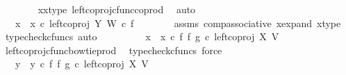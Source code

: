 \begin{isabellebody}
\ \ \ \ \ \ \isamarkupfalse%
\ x{}{\isacharunderscore}{\kern0pt}x{}{\isacharunderscore}{\kern0pt}type\ left{\isacharunderscore}{\kern0pt}coproj{\isacharunderscore}{\kern0pt}cfunc{\isacharunderscore}{\kern0pt}coprod\ \isamarkupfalse%
\ auto\ \isanewline
\ \ \ \ \isamarkupfalse%
\ \isamarkupfalse%
\ {\isachardoublequoteopen}{\isachardot}{\kern0pt}{\isachardot}{\kern0pt}{\isachardot}{\kern0pt}\ {\isacharequal}{\kern0pt}\ {\isacharparenleft}{\kern0pt}x{}\ {\isasymamalg}\ x{}{\isacharparenright}{\kern0pt}\ {\isasymcirc}\isactrlsub c\ left{\isacharunderscore}{\kern0pt}coproj\ Y\ W\ {\isasymcirc}\isactrlsub c\ f{\isachardoublequoteclose}\isanewline
\ \ \ \ \ \ \isamarkupfalse%
\ assms\ comp{\isacharunderscore}{\kern0pt}associative{}\ x{\isacharunderscore}{\kern0pt}expand\ x{\isacharunderscore}{\kern0pt}type\ \isamarkupfalse%
\ {\isacharparenleft}{\kern0pt}typecheck{\isacharunderscore}{\kern0pt}cfuncs{\isacharcomma}{\kern0pt}\ auto{\isacharparenright}{\kern0pt}\isanewline
\ \ \ \ \isamarkupfalse%
\ \isamarkupfalse%
\ {\isachardoublequoteopen}{\isachardot}{\kern0pt}{\isachardot}{\kern0pt}{\isachardot}{\kern0pt}\ {\isacharequal}{\kern0pt}\ {\isacharparenleft}{\kern0pt}x{}\ {\isasymamalg}\ x{}{\isacharparenright}{\kern0pt}\ {\isasymcirc}\isactrlsub c\ {\isacharparenleft}{\kern0pt}f\ {\isasymbowtie}\isactrlsub f\ g{\isacharparenright}{\kern0pt}\ {\isasymcirc}\isactrlsub c\ left{\isacharunderscore}{\kern0pt}coproj\ X\ V{\isachardoublequoteclose}\isanewline
\ \ \ \ \ \ \isamarkupfalse%
\ left{\isacharunderscore}{\kern0pt}coproj{\isacharunderscore}{\kern0pt}cfunc{\isacharunderscore}{\kern0pt}bowtie{\isacharunderscore}{\kern0pt}prod\ \isamarkupfalse%
\ {\isacharparenleft}{\kern0pt}typecheck{\isacharunderscore}{\kern0pt}cfuncs{\isacharcomma}{\kern0pt}\ force{\isacharparenright}{\kern0pt}\isanewline
\ \ \ \ \isamarkupfalse%
\ \isamarkupfalse%
\ {\isachardoublequoteopen}{\isachardot}{\kern0pt}{\isachardot}{\kern0pt}{\isachardot}{\kern0pt}\ {\isacharequal}{\kern0pt}\ {\isacharparenleft}{\kern0pt}y{}\ {\isasymamalg}\ y{}{\isacharparenright}{\kern0pt}\ {\isasymcirc}\isactrlsub c\ {\isacharparenleft}{\kern0pt}f\ {\isasymbowtie}\isactrlsub f\ g{\isacharparenright}{\kern0pt}\ {\isasymcirc}\isactrlsub c\ left{\isacharunderscore}{\kern0pt}coproj\ X\ V{\isachardoublequoteclose}\isanewline

\end{isabellebody}
